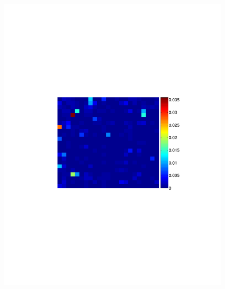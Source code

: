 \begin{figure}[h]
\begin{minipage}[c]{0.3\hsize}
\includegraphics[width=\hsize]{../figs/FigureA11_real_Xcorr}
\end{minipage}
\begin{minipage}[c]{0.3\hsize}

\end{minipage}
\end{figure}

